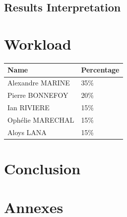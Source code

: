 \documentclass[a4paper, 11pt]{article}
\begin{document}
    \subsection{Results Interpretation}
       

\section{Workload}
\begin{center}
    \begin{tabular}{|p{2cm}|p{2cm}|}
        \hline
        \textbf{Name} & \textbf{Percentage} \\
        \hline
        \hline
        Alexandre MARINE &  35\% \\
        \hline 
        Pierre BONNEFOY &  20\% \\
        \hline
        Ian RIVIERE & 15\% \\
        \hline
        Ophélie MARECHAL &  15\% \\
        \hline 
        Aloys LANA &  15\% \\
        \hline
    \end{tabular}
\end{center}

\section{Conclusion}

\newpage

\appendix
\section{Annexes}

\listofalgocfs
\newpage
\end{document}
